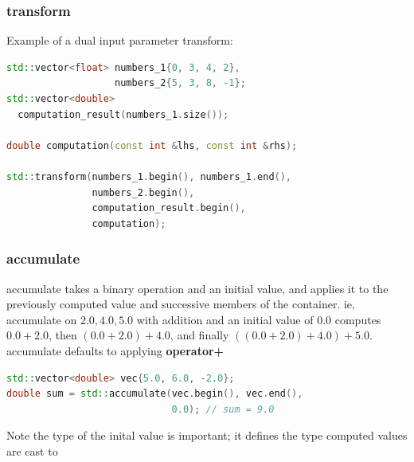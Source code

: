 \documentclass{beamer}
\begin{document}
\begin{frame}[fragile]
  \frametitle{transform}
  Example of a dual input parameter transform:
  \begin{lstlisting}[language=C++]
std::vector<float> numbers_1{0, 3, 4, 2},
                   numbers_2{5, 3, 8, -1};
std::vector<double>
  computation_result(numbers_1.size());

double computation(const int &lhs, const int &rhs);

std::transform(numbers_1.begin(), numbers_1.end(),
               numbers_2.begin(),
               computation_result.begin(),
               computation);
  \end{lstlisting}
\end{frame}




\begin{frame}[fragile]
  \frametitle{accumulate}
  accumulate takes a binary operation and an initial value,
  and applies it to the previously computed value and successive members of the container.
  ie, accumulate on ${2.0, 4.0, 5.0}$ with addition and an initial value of $0.0$ computes
  $0.0 + 2.0$, then $(0.0 + 2.0) + 4.0$, and finally $((0.0 + 2.0) + 4.0) + 5.0$.\\
  accumulate defaults to applying {\bf operator+}\\
  \begin{lstlisting}[language=C++]
std::vector<double> vec{5.0, 6.0, -2.0};
double sum = std::accumulate(vec.begin(), vec.end(),
                             0.0); // sum = 9.0
  \end{lstlisting}
Note the type of the inital value is important; it defines the type computed values are cast to
\end{frame}
\end{document}
